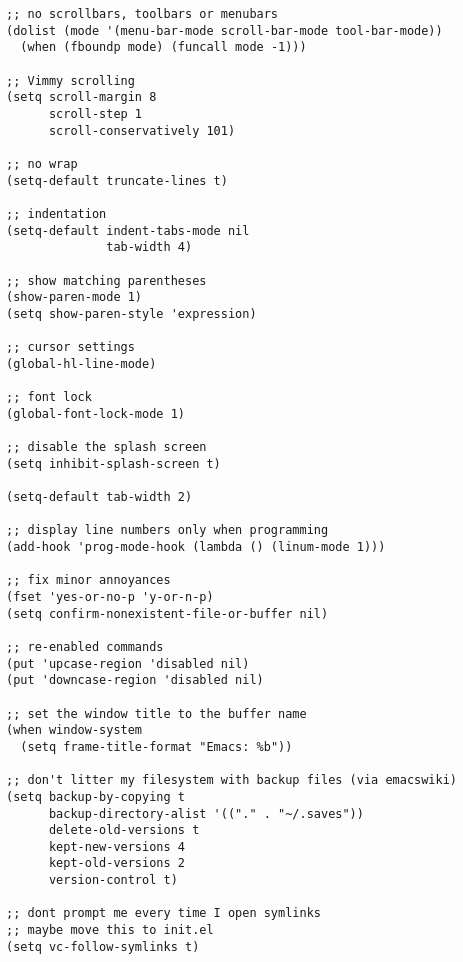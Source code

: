 \documentclass[11pt]{article}
\begin{document}
\begin{verbatim}
;; no scrollbars, toolbars or menubars
(dolist (mode '(menu-bar-mode scroll-bar-mode tool-bar-mode))
  (when (fboundp mode) (funcall mode -1)))

;; Vimmy scrolling
(setq scroll-margin 8
      scroll-step 1
      scroll-conservatively 101)

;; no wrap
(setq-default truncate-lines t)

;; indentation
(setq-default indent-tabs-mode nil
              tab-width 4)

;; show matching parentheses
(show-paren-mode 1)
(setq show-paren-style 'expression)

;; cursor settings
(global-hl-line-mode)

;; font lock
(global-font-lock-mode 1)

;; disable the splash screen
(setq inhibit-splash-screen t)

(setq-default tab-width 2)

;; display line numbers only when programming
(add-hook 'prog-mode-hook (lambda () (linum-mode 1)))

;; fix minor annoyances
(fset 'yes-or-no-p 'y-or-n-p)
(setq confirm-nonexistent-file-or-buffer nil)

;; re-enabled commands
(put 'upcase-region 'disabled nil)
(put 'downcase-region 'disabled nil)

;; set the window title to the buffer name
(when window-system
  (setq frame-title-format "Emacs: %b"))

;; don't litter my filesystem with backup files (via emacswiki)
(setq backup-by-copying t
      backup-directory-alist '(("." . "~/.saves"))
      delete-old-versions t
      kept-new-versions 4
      kept-old-versions 2
      version-control t)

;; dont prompt me every time I open symlinks
;; maybe move this to init.el
(setq vc-follow-symlinks t)
\end{verbatim}
\end{document}
